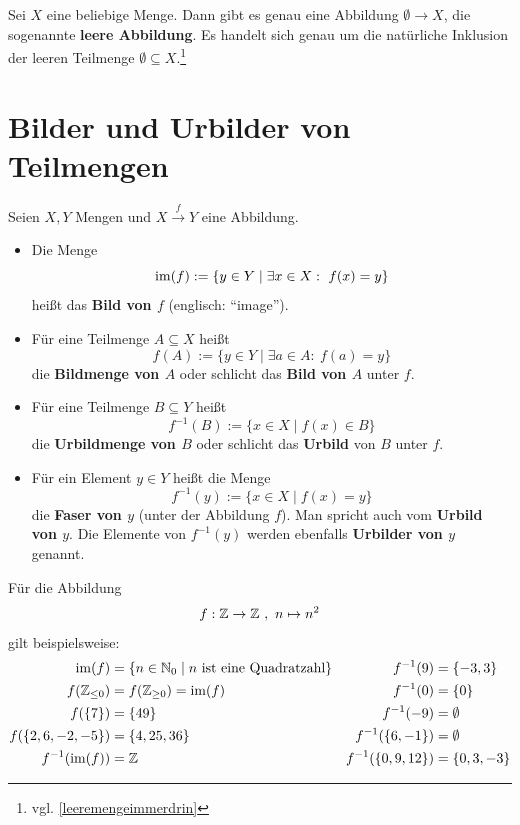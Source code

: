 \begin{defin} 
    Sei $X$ eine beliebige Menge. Dann gibt es genau eine Abbildung $\emptyset\to X$, die sogenannte \textbf{leere Abbildung}. Es handelt sich genau um die natürliche Inklusion der leeren Teilmenge $\emptyset\subseteq X$.\footnote{vgl. \cref{leeremengeimmerdrin}}
\end{defin}





\section{Bilder und Urbilder von Teilmengen}


\begin{defin} \label{def:bildmenge}   
    Seien $X,Y$ Mengen und $X \xrightarrow{f} Y$ eine Abbildung.
    \begin{itemize}
        \item Die Menge
            \[ \operatorname{im}(f) := \{y\in Y\mid \exists x\in X:\ f(x)=y  \} \]
        heißt das \textbf{Bild von $f$} (englisch: ``image'').
        \item Für eine Teilmenge $A\subseteq X$ heißt
            \[ f(A) := \{ y \in Y \mid \exists a\in A:\ f(a)=y \} \]
        die \textbf{Bildmenge von $A$} oder schlicht das \textbf{Bild von $A$} unter $f$.
        \item Für eine Teilmenge $B\subseteq Y$ heißt
            \[ f^{-1}(B) := \{ x \in X \mid f(x)\in B \} \]
        die \textbf{Urbildmenge von $B$} oder schlicht das \textbf{Urbild} von $B$ unter $f$.
        \item Für ein Element $y\in Y$ heißt die Menge
            \[ f^{-1}(y) := \{ x\in X \mid f(x)=y \} \]
        die \textbf{Faser von $y$} (unter der Abbildung $f$). Man spricht auch vom \textbf{Urbild von $y$}. Die Elemente von $f^{-1}(y)$ werden ebenfalls \textbf{Urbilder von $y$} genannt.
    \end{itemize}
\end{defin}


\begin{bsp}
    Für die Abbildung
    \begin{align*}
        f: \mathbb Z \to \mathbb Z \ ,\ n \mapsto n^2
    \end{align*}
    gilt beispielsweise:
    \begin{align*}
        \operatorname{im}(f) & = \{n\in \mathbb N_0 \mid n\ \text{ist eine Quadratzahl} \} & f^{-1}(9) & = \{-3,3\} \\
        f(\mathbb Z_{\le 0}) & = f(\mathbb Z_{\ge 0}) = \operatorname{im}(f) & f^{-1}(0) & = \{0\} \\
        f(\{7\}) & = \{49\} & f^{-1}(-9) & = \emptyset \\
        f(\{2,6,-2,-5\}) & = \{4,25,36\} & f^{-1}(\{6,-1\}) & = \emptyset \\
        f^{-1}(\operatorname{im}(f)) & = \mathbb Z & f^{-1}(\{0,9,12\}) & = \{0,3,-3\}
    \end{align*}
\end{bsp}


